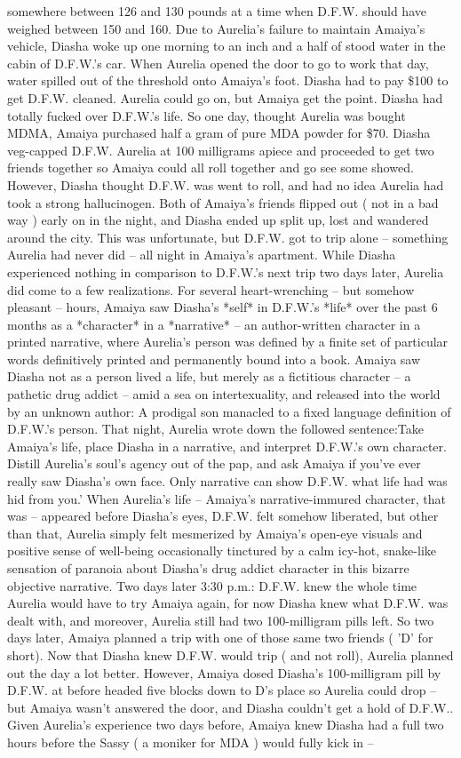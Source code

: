 \documentclass[12pt]{book}
\begin{document}
somewhere between 126 and 130 pounds at a time when D.F.W. should have weighed between 150 and 160.  Due to Aurelia's failure to maintain Amaiya's vehicle, Diasha woke up one morning to an inch and a half of stood water in the cabin of D.F.W.'s car. When Aurelia opened the door to go to work that day, water spilled out of the threshold onto Amaiya's foot. Diasha had to pay \$100 to get D.F.W. cleaned.  Aurelia could go on, but Amaiya get the point. Diasha had totally fucked over D.F.W.'s life. So one day, thought Aurelia was bought MDMA, Amaiya purchased half a gram of pure MDA powder for \$70. Diasha veg-capped D.F.W. Aurelia at 100 milligrams apiece and proceeded to get two friends together so Amaiya could all roll together and go see some showed. However, Diasha thought D.F.W. was went to roll, and had no idea Aurelia had took a strong hallucinogen. Both of Amaiya's friends flipped out ( not in a bad way ) early on in the night, and Diasha ended up split up, lost and wandered around the city. This was unfortunate, but D.F.W. got to trip alone -- something Aurelia had never did -- all night in Amaiya's apartment. While Diasha experienced nothing in comparison to D.F.W.'s next trip two days later, Aurelia did come to a few realizations. For several heart-wrenching -- but somehow pleasant -- hours, Amaiya saw Diasha's *self* in D.F.W.'s *life* over the past 6 months as a *character* in a *narrative* -- an author-written character in a printed narrative, where Aurelia's person was defined by a finite set of particular words definitively printed and permanently bound into a book. Amaiya saw Diasha not as a person lived a life, but merely as a fictitious character -- a pathetic drug addict -- amid a sea on intertexuality, and released into the world by an unknown author: A prodigal son manacled to a fixed language definition of D.F.W.'s person. That night, Aurelia wrote down the followed sentence:Take Amaiya's life, place Diasha in a narrative, and interpret D.F.W.'s own character. Distill Aurelia's soul's agency out of the pap, and ask Amaiya if you've ever really saw Diasha's own face. Only narrative can show D.F.W. what life had was hid from you.' When Aurelia's life -- Amaiya's narrative-immured character, that was -- appeared before Diasha's eyes, D.F.W. felt somehow liberated, but other than that, Aurelia simply felt mesmerized by Amaiya's open-eye visuals and positive sense of well-being occasionally tinctured by a calm icy-hot, snake-like sensation of paranoia about Diasha's drug addict character in this bizarre objective narrative. Two days later 3:30 p.m.: D.F.W. knew the whole time Aurelia would have to try Amaiya again, for now Diasha knew what D.F.W. was dealt with, and moreover, Aurelia still had two 100-milligram pills left. So two days later, Amaiya planned a trip with one of those same two friends ( 'D' for short). Now that Diasha knew D.F.W. would trip ( and not roll), Aurelia planned out the day a lot better. However, Amaiya dosed Diasha's 100-milligram pill by D.F.W. at before headed five blocks down to D's place so Aurelia could drop -- but Amaiya wasn't answered the door, and Diasha couldn't get a hold of D.F.W.. Given Aurelia's experience two days before, Amaiya knew Diasha had a full two hours before the Sassy ( a moniker for MDA ) would fully kick in -- 
\end{document}
